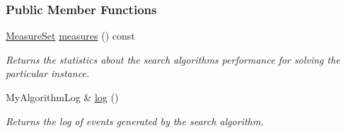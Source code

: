 \subsubsection*{Public Member Functions}
\begin{DoxyCompactItemize}
\item 
\hyperlink{structslb_1_1core_1_1sb_1_1MeasureSet}{Measure\+Set} \hyperlink{structslb_1_1ext_1_1algorithm_1_1Algorithm_a539d8d4e7d92ed9a80c778b530754c13}{measures} () const 
\begin{DoxyCompactList}\small\item\em Returns the statistics about the search algorithm\textquotesingle{}s performance for solving the particular instance. \end{DoxyCompactList}\item 
My\+Algorithm\+Log \& \hyperlink{structslb_1_1ext_1_1algorithm_1_1Algorithm_aa8adc2ad3941377d1b34e92ff66d2c6a}{log} ()
\begin{DoxyCompactList}\small\item\em Returns the log of events generated by the search algorithm. \end{DoxyCompactList}\end{DoxyCompactItemize}
